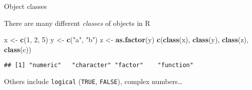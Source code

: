 \documentclass[ignorenonframetext,]{beamer}
\newenvironment{Shaded}{\begin{snugshade}}{\end{snugshade}}
\newcommand{\DecValTok}[1]{\textcolor[rgb]{0.00,0.00,0.81}{#1}}
\newcommand{\KeywordTok}[1]{\textcolor[rgb]{0.13,0.29,0.53}{\textbf{#1}}}
\newcommand{\NormalTok}[1]{#1}
\newcommand{\StringTok}[1]{\textcolor[rgb]{0.31,0.60,0.02}{#1}}
\begin{document}
\begin{frame}[fragile]{Object classes}
\protect\hypertarget{object-classes}{}

There are many different \emph{classes} of objects in R

\begin{Shaded}
\begin{Highlighting}[]
\NormalTok{x <-}\StringTok{ }\KeywordTok{c}\NormalTok{(}\DecValTok{1}\NormalTok{, }\DecValTok{2}\NormalTok{, }\DecValTok{5}\NormalTok{)}
\NormalTok{y <-}\StringTok{ }\KeywordTok{c}\NormalTok{(}\StringTok{"a"}\NormalTok{, }\StringTok{"b"}\NormalTok{)}
\NormalTok{z <-}\StringTok{ }\KeywordTok{as.factor}\NormalTok{(y)}
\KeywordTok{c}\NormalTok{(}\KeywordTok{class}\NormalTok{(x), }\KeywordTok{class}\NormalTok{(y), }\KeywordTok{class}\NormalTok{(z), }\KeywordTok{class}\NormalTok{(c))}
\end{Highlighting}
\end{Shaded}

\begin{verbatim}
## [1] "numeric"   "character" "factor"    "function"
\end{verbatim}

Others include \texttt{logical} (\texttt{TRUE}, \texttt{FALSE}), complex
numbers\ldots{}

\end{frame}
\end{document}
